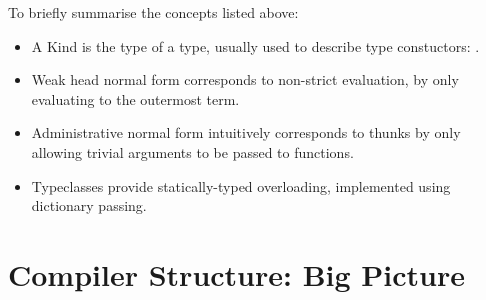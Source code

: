 \documentclass[dissertation.tex]{subfiles}
\begin{document}
{{        To briefly summarise the concepts listed above:
        \begin{itemize}
        \item A Kind is the type of a type, usually used to describe type constuctors: .
        \item Weak head normal form corresponds to non-strict evaluation, by only evaluating to the outermost term.
        \item
        {
            Administrative normal form intuitively corresponds to thunks by only allowing trivial arguments to be
            passed to functions.
        }
        \item Typeclasses provide statically-typed overloading, implemented using dictionary passing.
        \end{itemize}
    }
}
\section{Compiler Structure: Big Picture}\label{sec:compiler-structure}
\end{document}
